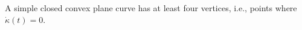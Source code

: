 A simple closed convex plane curve has at least four vertices, i.e., points where $\dot{\kappa}(t) = 0$.
